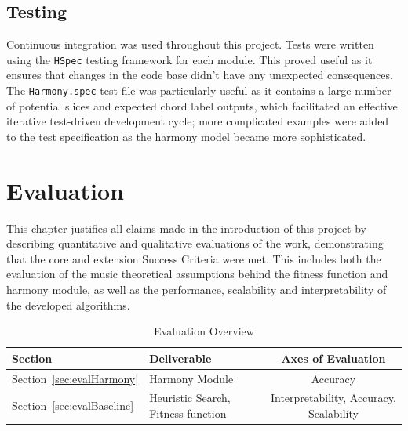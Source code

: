 \documentclass[12pt,a4paper,twoside,openany]{report} \usepackage[pdfborder={0 0 0}]{hyperref}    %
\theoremstyle{definition} \newtheorem{definition}{Definition}[section]
\begin{document}
  \section{Testing}
  \label{sec:testing}
  \label{sub:unittests}

  Continuous integration was used throughout this project. Tests were written using the \texttt{HSpec} testing
  framework for each module. This proved useful as it ensures that changes in the code base didn't have any unexpected
  consequences. The \texttt{Harmony.spec} test file was particularly useful as it contains a large number of potential
  slices and expected chord label outputs, which facilitated an effective iterative test-driven development cycle;
  more complicated examples were added to the test specification as the harmony model became more
  sophisticated.

\chapter{Evaluation} 
\label{chap:evaluation}

This chapter justifies all claims made in the introduction of this project by describing quantitative and qualitative
evaluations of the work, demonstrating that the core and extension Success Criteria were met. This includes both the
evaluation of the music theoretical assumptions behind the fitness function and harmony module, as well as the
performance, scalability and interpretability of the developed algorithms.

  \begin{table}[ht!] 
  \caption{Evaluation Overview} 
  \label{tab:evaluationOverview} 
  \centering
  {\small
  \begin{tabularx}{0.8\textwidth}{lXc} 
    Section & Deliverable & Axes of Evaluation  \\
    \toprule 
    Section~\ref{sec:evalHarmony} & Harmony Module & Accuracy \\
    Section~\ref{sec:evalBaseline}& Heuristic Search, Fitness function & Interpretability, Accuracy, Scalability \\
    \end{tabularx} 
  }
  \end{table}

\end{document}
